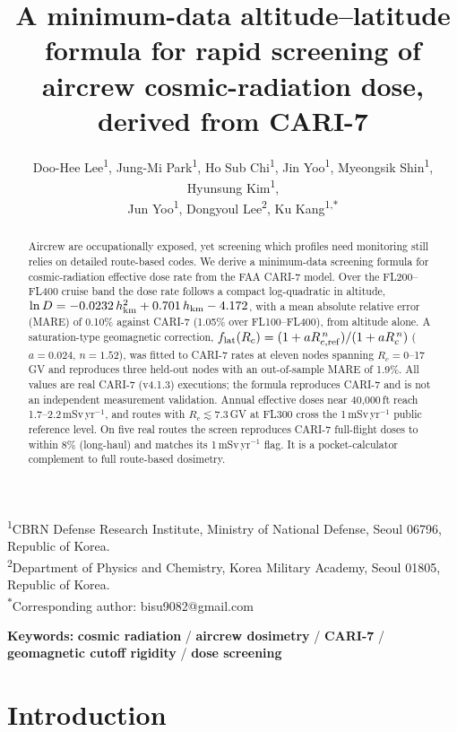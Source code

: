 \documentclass[11pt,a4paper]{article}
\title{\bfseries A minimum-data altitude--latitude formula for rapid
screening of aircrew cosmic-radiation dose, derived from CARI-7}
\author{%
Doo-Hee Lee\textsuperscript{1}, Jung-Mi Park\textsuperscript{1},
Ho Sub Chi\textsuperscript{1}, Jin Yoo\textsuperscript{1},
Myeongsik Shin\textsuperscript{1}, Hyunsung Kim\textsuperscript{1},\\
Jun Yoo\textsuperscript{1}, Dongyoul Lee\textsuperscript{2},
Ku Kang\textsuperscript{1,$*$}}
\date{}
\begin{document}
\maketitle

\noindent\textsuperscript{1}CBRN Defense Research Institute, Ministry of
National Defense, Seoul 06796, Republic of Korea.\\
\textsuperscript{2}Department of Physics and Chemistry, Korea Military
Academy, Seoul 01805, Republic of Korea.\\
\textsuperscript{$*$}Corresponding author: bisu9082@gmail.com

\begin{abstract}
\noindent
Aircrew are occupationally exposed, yet screening which profiles need
monitoring still relies on detailed route-based codes. We derive a
minimum-data screening formula for cosmic-radiation effective dose rate
from the FAA CARI-7 model. Over the FL200--FL400 cruise band the dose rate
follows a compact log-quadratic in altitude,
$\ln D=-0.0232\,h_{\rm km}^{2}+0.701\,h_{\rm km}-4.172$, with a mean
absolute relative error (MARE) of 0.10\% against CARI-7 (1.05\% over
FL100--FL400), from altitude alone. A saturation-type geomagnetic
correction, $f_{\rm lat}(R_c)=(1+aR_{c,\rm ref}^{\,n})/(1+aR_c^{\,n})$
($a=0.024$, $n=1.52$), was fitted to CARI-7 rates at eleven nodes spanning
$R_c=0$--17\,GV and reproduces three held-out nodes with an out-of-sample
MARE of 1.9\%. All values are real CARI-7 (v4.1.3) executions; the formula
reproduces CARI-7 and is not an independent measurement validation. Annual
effective doses near 40{,}000\,ft reach 1.7--2.2\,mSv\,yr$^{-1}$, and routes
with $R_c\lesssim7.3$\,GV at FL300 cross the 1\,mSv\,yr$^{-1}$ public
reference level. On five real routes the screen reproduces CARI-7
full-flight doses to within 8\% (long-haul) and matches its
1\,mSv\,yr$^{-1}$ flag. It is a pocket-calculator complement to full
route-based dosimetry.
\end{abstract}

\vspace{0.4em}
\noindent\textbf{Keywords:} \textbf{cosmic radiation} / \textbf{aircrew
dosimetry} / \textbf{CARI-7} / \textbf{geomagnetic cutoff rigidity} /
\textbf{dose screening}

\section{Introduction}
\end{document}

